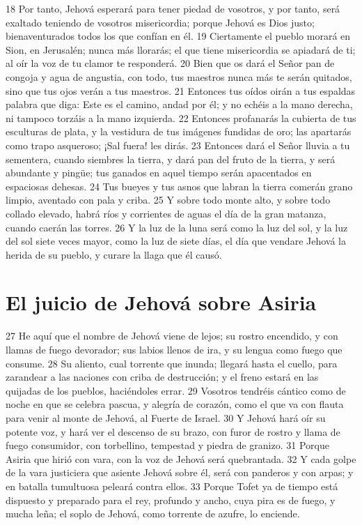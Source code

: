 18 Por tanto, Jehová esperará para tener piedad de vosotros, y por tanto, será exaltado teniendo de vosotros misericordia; porque Jehová es Dios justo; bienaventurados todos los que confían en él.
19 Ciertamente el pueblo morará en Sion, en Jerusalén; nunca más llorarás; el que tiene misericordia se apiadará de ti; al oír la voz de tu clamor te responderá.
20 Bien que os dará el Señor pan de congoja y agua de angustia, con todo, tus maestros nunca más te serán quitados, sino que tus ojos verán a tus maestros.
21 Entonces tus oídos oirán a tus espaldas palabra que diga: Este es el camino, andad por él; y no echéis a la mano derecha, ni tampoco torzáis a la mano izquierda.
22 Entonces profanarás la cubierta de tus esculturas de plata, y la vestidura de tus imágenes fundidas de oro; las apartarás como trapo asqueroso; ¡Sal fuera! les dirás.
23 Entonces dará el Señor lluvia a tu sementera, cuando siembres la tierra, y dará pan del fruto de la tierra, y será abundante y pingüe; tus ganados en aquel tiempo serán apacentados en espaciosas dehesas.
24 Tus bueyes y tus asnos que labran la tierra comerán grano limpio, aventado con pala y criba.
25 Y sobre todo monte alto, y sobre todo collado elevado, habrá ríos y corrientes de aguas el día de la gran matanza, cuando caerán las torres.
26 Y la luz de la luna será como la luz del sol, y la luz del sol siete veces mayor, como la luz de siete días, el día que vendare Jehová la herida de su pueblo, y curare la llaga que él causó.

\section*{El juicio de Jehová sobre Asiria}

27 He aquí que el nombre de Jehová viene de lejos; su rostro encendido, y con llamas de fuego devorador; sus labios llenos de ira, y su lengua como fuego que consume.
28 Su aliento, cual torrente que inunda; llegará hasta el cuello, para zarandear a las naciones con criba de destrucción; y el freno estará en las quijadas de los pueblos, haciéndoles errar.
29 Vosotros tendréis cántico como de noche en que se celebra pascua, y alegría de corazón, como el que va con flauta para venir al monte de Jehová, al Fuerte de Israel.
30 Y Jehová hará oír su potente voz, y hará ver el descenso de su brazo, con furor de rostro y llama de fuego consumidor, con torbellino, tempestad y piedra de granizo.
31 Porque Asiria que hirió con vara, con la voz de Jehová será quebrantada.
32 Y cada golpe de la vara justiciera que asiente Jehová sobre él, será con panderos y con arpas; y en batalla tumultuosa peleará contra ellos.
33 Porque Tofet ya de tiempo está dispuesto y preparado para el rey, profundo y ancho, cuya pira es de fuego, y mucha leña; el soplo de Jehová, como torrente de azufre, lo enciende.

